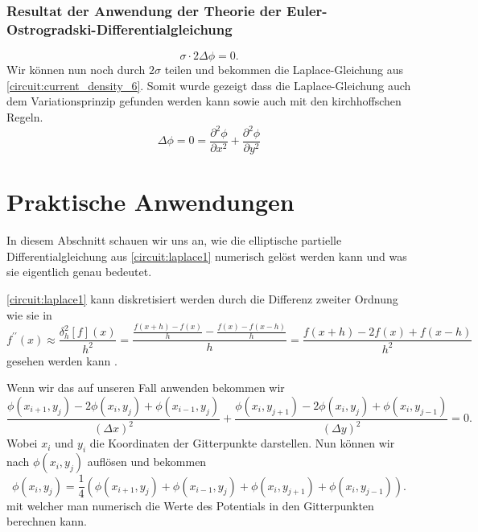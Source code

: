 \subsubsection{Resultat der Anwendung der Theorie der Euler-Ostrogradski-Differentialgleichung}
	\begin{equation}
	\sigma \cdot 2\Delta\phi=0.
	\end{equation}
Wir können nun noch durch $2\sigma$ teilen und bekommen die Laplace-Gleichung aus \eqref{circuit:current_density_6}. Somit wurde gezeigt dass die Laplace-Gleichung auch dem Variationsprinzip gefunden werden kann sowie auch mit den kirchhoffschen Regeln.
	\begin{equation}
	\Delta\phi=0=\frac{\partial^2\phi}{\partial x^2}+\frac{\partial^2\phi}{\partial y^2}
	\label{circuit:laplace1}
	\end{equation}


\section{Praktische Anwendungen}
In diesem Abschnitt schauen wir uns an, wie die elliptische partielle Differentialgleichung aus \eqref{circuit:laplace1} numerisch gelöst werden kann und was sie eigentlich genau bedeutet.

\eqref{circuit:laplace1} kann diskretisiert werden durch die Differenz zweiter Ordnung wie sie in 
\begin{equation}
	f^{\prime \prime}(x) \approx \frac{\delta_h^2[f](x)}{h^2}=\frac{\frac{f(x+h)-f(x)}{h}-\frac{f(x)-f(x-h)}{h}}{h}=\frac{f(x+h)-2 f(x)+f(x-h)}{h^2}
	\label{circuit:second-order-central}
\end{equation}
gesehen werden kann \cite{enwiki:1220817436}.

Wenn wir das auf unseren Fall anwenden bekommen wir
\begin{equation}
	\frac{\phi(x_{i+1}, y_j) - 2\phi(x_i, y_j) + \phi(x_{i-1}, y_j)}{(\Delta x)^2} + \frac{\phi(x_i, y_{j+1}) - 2\phi(x_i, y_j) + \phi(x_i, y_{j-1})}{(\Delta y)^2} = 0.
	\label{circuit:discret_equation}
\end{equation}
Wobei $x_i$ und $y_i$ die Koordinaten der Gitterpunkte darstellen.
Nun können wir nach $\phi(x_i, y_j)$ auflösen und bekommen 
\begin{equation}
	\phi(x_i, y_j) = \frac{1}{4}(\phi(x_{i+1}, y_{j}) + \phi(x_{i-1}, y_{j}) + \phi(x_{i}, y_{j+1}) + \phi(x_{i}, y_{j-1})).
	\label{circuit:discret_equation2}
\end{equation}
mit welcher man numerisch die Werte des Potentials in den Gitterpunkten berechnen kann.
